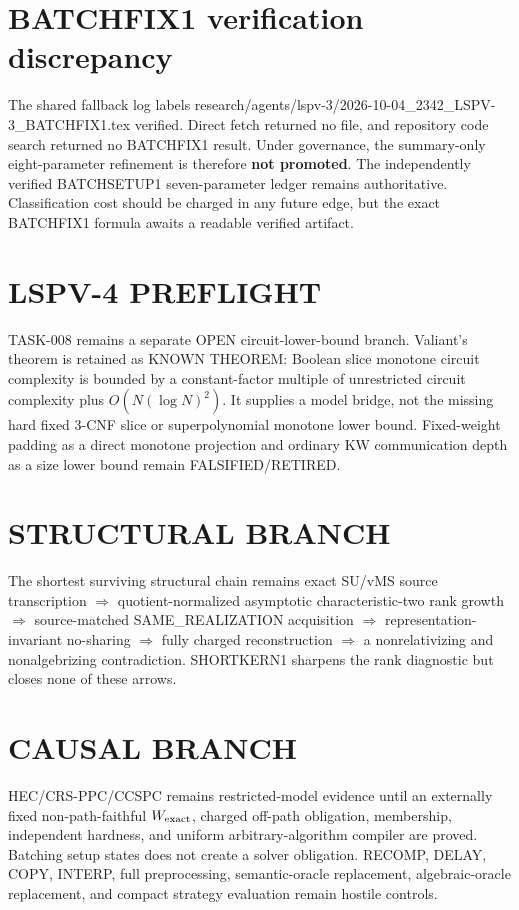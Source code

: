 \documentclass[11pt]{article}
\begin{document}
\section*{BATCHFIX1 verification discrepancy}
The shared fallback log labels research/agents/lspv-3/2026-10-04_2342_LSPV-3_BATCHFIX1.tex verified. Direct fetch returned no file, and repository code search returned no BATCHFIX1 result. Under governance, the summary-only eight-parameter refinement is therefore \textbf{not promoted}. The independently verified BATCHSETUP1 seven-parameter ledger remains authoritative. Classification cost should be charged in any future edge, but the exact BATCHFIX1 formula awaits a readable verified artifact.

\section*{LSPV-4 PREFLIGHT}
TASK-008 remains a separate OPEN circuit-lower-bound branch. Valiant's theorem is retained as KNOWN THEOREM: Boolean slice monotone circuit complexity is bounded by a constant-factor multiple of unrestricted circuit complexity plus $O(N(\log N)^2)$. It supplies a model bridge, not the missing hard fixed 3-CNF slice or superpolynomial monotone lower bound. Fixed-weight padding as a direct monotone projection and ordinary KW communication depth as a size lower bound remain FALSIFIED/RETIRED.

\section*{STRUCTURAL BRANCH}
The shortest surviving structural chain remains exact SU/vMS source transcription $\Rightarrow$ quotient-normalized asymptotic characteristic-two rank growth $\Rightarrow$ source-matched SAME\_REALIZATION acquisition $\Rightarrow$ representation-invariant no-sharing $\Rightarrow$ fully charged reconstruction $\Rightarrow$ a nonrelativizing and nonalgebrizing contradiction. SHORTKERN1 sharpens the rank diagnostic but closes none of these arrows.

\section*{CAUSAL BRANCH}
HEC/CRS-PPC/CCSPC remains restricted-model evidence until an externally fixed non-path-faithful $W_{\rm exact}$, charged off-path obligation, membership, independent hardness, and uniform arbitrary-algorithm compiler are proved. Batching setup states does not create a solver obligation. RECOMP, DELAY, COPY, INTERP, full preprocessing, semantic-oracle replacement, algebraic-oracle replacement, and compact strategy evaluation remain hostile controls.
\end{document}
